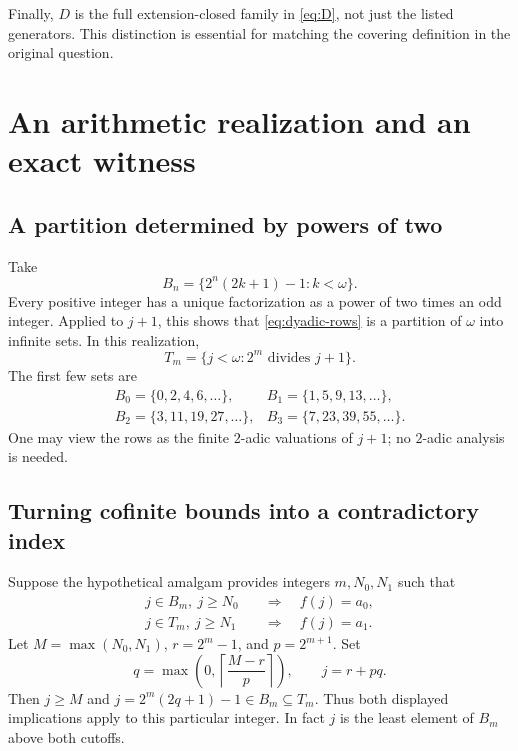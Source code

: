 \documentclass[11pt,letterpaper]{article}
\theoremstyle{definition}
\theoremstyle{remark}
\newcommand{\om}{\omega}
\begin{document}
Finally, $D$ is the full extension-closed family in \eqref{eq:D}, not
just the listed generators. This distinction is essential for matching
the covering definition in the original question.

\section{An arithmetic realization and an exact witness}
\label{sec:arithmetic}

\subsection{A partition determined by powers of two}
Take
\begin{equation}\label{eq:dyadic-rows}
 B_n=\{2^n(2k+1)-1:k<\om\}.
\end{equation}
Every positive integer has a unique factorization as a power of two times
an odd integer. Applied to $j+1$, this shows that \eqref{eq:dyadic-rows}
is a partition of $\om$ into infinite sets. In this realization,
\begin{equation}\label{eq:dyadic-tails}
 T_m=\{j<\om:2^m\text{ divides }j+1\}.
\end{equation}
The first few sets are
\[
\begin{array}{ll}
 B_0=\{0,2,4,6,\ldots\}, & B_1=\{1,5,9,13,\ldots\},\\
 B_2=\{3,11,19,27,\ldots\}, & B_3=\{7,23,39,55,\ldots\}.
\end{array}
\]
One may view the rows as the finite $2$-adic valuations of $j+1$; no
$2$-adic analysis is needed.

\subsection{Turning cofinite bounds into a contradictory index}
Suppose the hypothetical amalgam provides integers $m,N_0,N_1$ such that
\begin{align*}
  j\in B_m,\ j\geq N_0&\quad\Longrightarrow\quad f(j)=a_0,\\
  j\in T_m,\ j\geq N_1&\quad\Longrightarrow\quad f(j)=a_1.
\end{align*}
Let $M=\max(N_0,N_1)$, $r=2^m-1$, and $p=2^{m+1}$. Set
\begin{equation}\label{eq:witness}
 q=\max\left(0,\left\lceil\frac{M-r}{p}\right\rceil\right),
 \qquad j=r+pq.
\end{equation}
Then $j\geq M$ and
$j=2^m(2q+1)-1\in B_m\subseteq T_m$. Thus both displayed implications
apply to this particular integer. In fact $j$ is the least element of
$B_m$ above both cutoffs.
\end{document}
